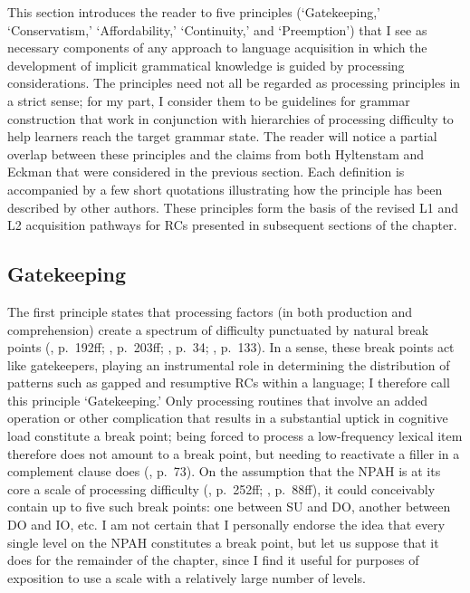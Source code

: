 This section introduces the reader to five principles (`Gatekeeping,' `Conservatism,' `Affordability,' `Continuity,' and `Preemption') that I see as necessary components of any approach to language acquisition in which the development of implicit grammatical knowledge is guided by processing considerations. The principles need not all be regarded as processing principles in a strict sense; for my part, I consider them to be guidelines for grammar construction that work in conjunction with hierarchies of processing difficulty to help learners reach the target grammar state. The reader will notice a partial overlap between these principles and the claims from both Hyltenstam and Eckman that were considered in the previous section. Each definition is accompanied by a few short quotations illustrating how the principle has been described by other authors. These principles form the basis of the revised L1 and L2 acquisition pathways for RCs presented in subsequent sections of the chapter.

\subsection{Gatekeeping}\label{acq-gatekeeping}

The first principle states that processing factors (in both production and comprehension) create a spectrum of difficulty punctuated by natural break points (\cite{hawkins2004}, p.~192ff; \cite{ogrady2005}, p.~203ff; \cite{ogrady2011}, p.~34; \cite{ogrady2022a}, p.~133). In a sense, these break points act like gatekeepers, playing an instrumental role in determining the distribution of patterns such as gapped and resumptive RCs within a language; I therefore call this principle `Gatekeeping.' Only processing routines that involve an added operation or other complication that results in a substantial uptick in cognitive load constitute a break point; being forced to process a low-frequency lexical item therefore does not amount to a break point, but needing to reactivate a filler in a complement clause does (\cite{ogrady2022a}, p.~73). On the assumption that the NPAH is at its core a scale of processing difficulty (\cite{hawkins1999}, p.~252ff; \cite{keenan.comrie1977}, p.~88ff), it could conceivably contain up to five such break points: one between SU and DO, another between DO and IO, etc. I am not certain that I personally endorse the idea that every single level on the NPAH constitutes a break point, but let us suppose that it does for the remainder of the chapter, since I find it useful for purposes of exposition to use a scale with a relatively large number of levels.\footnotemark{}

